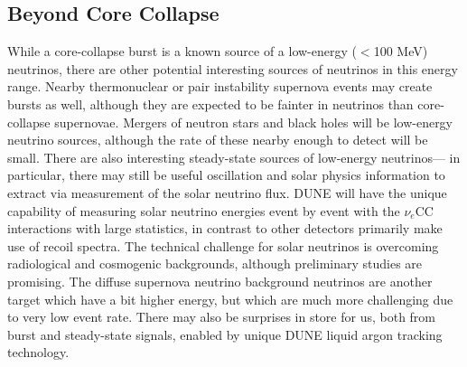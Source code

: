 \subsection{Beyond Core Collapse}
While a core-collapse burst is a known source of a
low-energy ($<$100 MeV) neutrinos, there are other potential
interesting sources of neutrinos in this energy range.  Nearby
thermonuclear or pair instability supernova events may create bursts
as well, although they are expected to be fainter in neutrinos than
core-collapse supernovae.  Mergers of neutron stars and black holes
will be low-energy neutrino sources, although the rate of these nearby
enough to detect will be small.  There are also interesting
steady-state sources of low-energy neutrinos--- in particular, there
may still be useful oscillation and solar physics information to
extract via measurement of the solar neutrino flux. DUNE will have the
unique capability of measuring solar neutrino energies event by event
with the $\nu_e$CC interactions with large statistics, in contrast to
other detectors primarily make use of recoil spectra.  The technical
challenge for solar neutrinos is overcoming radiological and
cosmogenic backgrounds, although preliminary studies are promising.
The diffuse supernova neutrino background neutrinos are another target
which have a bit higher energy, but which are much more challenging due to very low
event rate.  There may also be surprises in store for us, both from burst
and steady-state signals, enabled by unique DUNE liquid argon tracking
technology.

